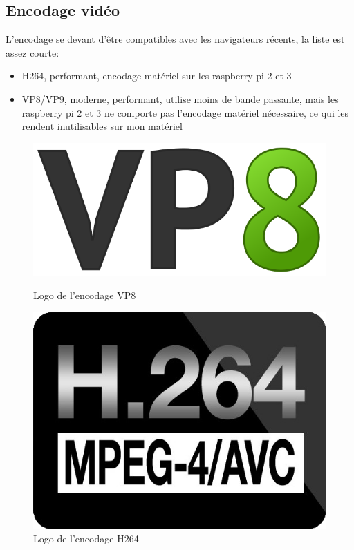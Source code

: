 \documentclass[12pt, a4paper]{report}
\begin{document}
\subsection{Encodage vidéo}
L'encodage se devant d'être compatibles avec les navigateurs récents, la liste est assez courte:\newline
\begin{itemize}
    \item H264, performant, encodage matériel sur les raspberry pi 2 et 3\newline
    \item VP8/VP9, moderne, performant, utilise moins de bande passante, mais les raspberry pi 2 et 3 ne comporte pas l'encodage matériel nécessaire, ce qui les rendent inutilisables sur mon matériel\newline
\end{itemize}
\begin{figure}[H]
    \begin{minipage}{.5\textwidth}
        \centering
        \includegraphics[width=\textwidth]{vp8.png}
        \caption{Logo de l'encodage VP8}
    \end{minipage}
    \begin{minipage}{.5\textwidth}
        \centering
        \includegraphics[width=\textwidth]{h264.png}
        \caption{Logo de l'encodage H264}
    \end{minipage}
\end{figure}
\end{document}
